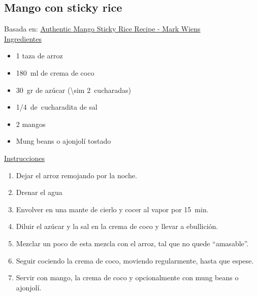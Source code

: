 \subsection{Mango con sticky rice}

Basada en: \href{https://www.youtube.com/watch?v=H_R108b6ZQg}{Authentic Mango Sticky Rice Recipe - Mark Wiens}\\

\underline{Ingredientes}
\begin{itemize}
\item 1 taza de arroz
\item \SI{180}{ml} de crema de coco
\item \SI{30}{gr} de azúcar (\SI{\sim 2}{cucharadas})
\item \SI{1/4}{de~cucharadita} de sal
\item 2 mangos
\item Mung beans o ajonjolí tostado
\end{itemize}

\underline{Instrucciones}
\begin{enumerate}
\item Dejar el arroz remojando por la noche.
\item Drenar el agua
\item Envolver en una mante de cierlo y cocer al vapor por \SI{15}{min}.
\item Diluir el azúcar y la sal en la crema de coco y llevar a ebullición.
\item Mezclar un poco de esta mezcla con el arroz, tal que no quede ``amasable''.
\item Seguir cociendo la crema de coco, moviendo regularmente, hasta que espese.
\item Servir con mango, la crema de coco y opcionalmente con mung beans o ajonjolí.
\end{enumerate}